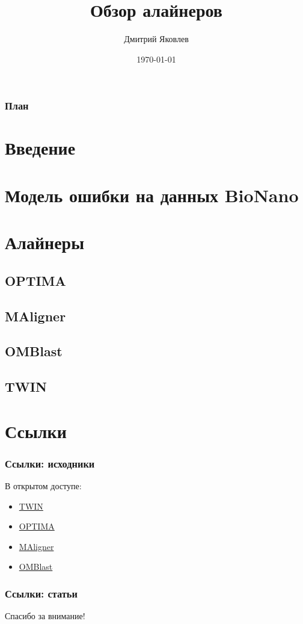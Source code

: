 \documentclass{beamer}
\title[Обзор алайнеров]{Обзор алайнеров}
\author{Дмитрий Яковлев}
\institute{EPAM Systems}
\date{\today}
\begin{document}
\graphicspath{{./img/}}

\begin{frame}
  \titlepage
\end{frame}

\begin{frame}
\frametitle{План}
\tableofcontents
\end{frame}

\section{Введение}


\section{Модель ошибки на данных BioNano}


\section{Алайнеры}

\subsection{OPTIMA}


\subsection{MAligner}


\subsection{OMBlast}


\subsection{TWIN}


\section{Ссылки}
\begin{frame}
\frametitle{Ссылки: исходники}
В открытом доступе:
\begin{itemize}
  \item \href{http://www.cs.colostate.edu/twin/download.html}{TWIN}
  \item \href{https://github.com/verznet/OPTIMA}{OPTIMA}
  \item \href{https://github.com/LeeMendelowitz/maligner}{MAligner}
  \item \href{https://github.com/aldenleung/OMBlast}{OMBlast}
\end{itemize}
\end{frame}

\begin{frame}[t,allowframebreaks]
\frametitle{Ссылки: статьи}
\printbibliography
\end{frame}

\begin{frame}

\begin{center}
\Huge Спасибо за внимание!
\end{center}

\end{frame}
\end{document}
